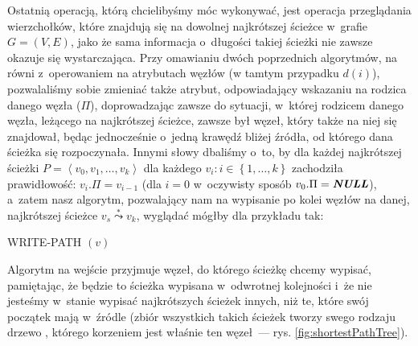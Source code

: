 Ostatnią operacją, którą chcielibyśmy móc wykonywać, jest operacja przeglądania wierzchołków, które znajdują się na dowolnej najkrótszej ścieżce w~grafie $G = \left( V, E \right)$, jako że sama informacja o~długości takiej ścieżki nie zawsze okazuje się wystarczająca. Przy omawianiu dwóch poprzednich algorytmów, na równi z~operowaniem na atrybutach węzłów (w tamtym przypadku $d \left( i \right)$), pozwalaliśmy sobie zmieniać także atrybut, odpowiadający wskazaniu na rodzica danego węzła ($\Pi$), doprowadzając zawsze do sytuacji, w~której rodzicem danego węzła, leżącego na najkrótszej ścieżce, zawsze był węzeł, który także na niej się znajdował, będąc jednocześnie o~jedną krawędź bliżej źródła, od którego dana ścieżka się rozpoczynała. Innymi słowy dbaliśmy o~to, by dla każdej najkrótszej ścieżki $ P = \left \langle v_{0}, v_{1}, \ldots, v_{k} \right \rangle$ dla każdego $v_{i} : i \in \left\{ 1, \ldots, k \right\}$ zachodziła prawidłowość: $v_{i}.\Pi = v_{i-1}$ (dla $i = 0$ w~oczywisty sposób $v_{0}.\Pi = \emph{\textbf{NULL}}$), a~zatem nasz algorytm, pozwalający nam na wypisanie po kolei węzłów na danej, najkrótszej ścieżce $v_{s} \overset{*} \leadsto v_{k}$, wyglądać mógłby dla przykładu tak:

\begin{algorithm}[!htbp]
\DontPrintSemicolon
{}
\caption{WRITE-PATH $\left( v \right)$ \label{alg:writePAth}}
\end{algorithm}

Algorytm na wejście przyjmuje węzeł, do którego ścieżkę chcemy wypisać, pamiętając, że będzie to ścieżka wypisana w~odwrotnej kolejności i~że nie jesteśmy w~stanie wypisać najkrótszych ścieżek innych, niż te, które swój początek mają w~źródle (zbiór wszystkich takich ścieżek tworzy swego rodzaju drzewo \cite[$24.5$]{Cormen}, którego korzeniem jest właśnie ten węzeł~---  rys. \ref{fig:shortestPathTree}).

